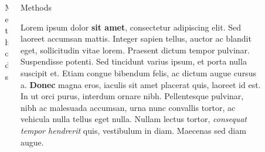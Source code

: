 \documentclass[final]{beamer}
\newlength{\sepwid}
\newlength{\onecolwid}
\newlength{\twocolwid}
\begin{document}
\begin{frame}[t]
\begin{columns}[t]
\begin{column}{\onecolwid}

\begin{figure}
\texttt{[image: poster-003]}
\caption{Figure caption}
\end{figure}


\end{column} %

\begin{column}{\sepwid}\end{column} %

\begin{column}{\twocolwid} %

\begin{columns}[t,totalwidth=\twocolwid] %

\begin{column}{\onecolwid}\vspace{-.6in} %


\begin{block}{Methods}



\end{block}


\end{column} %

\begin{column}{\onecolwid}\vspace{-.6in} %


\begin{block}{Methods}

Lorem ipsum dolor \textbf{sit amet}, consectetur adipiscing elit. Sed laoreet accumsan mattis. Integer sapien tellus, auctor ac blandit eget, sollicitudin vitae lorem. Praesent dictum tempor pulvinar. Suspendisse potenti. Sed tincidunt varius ipsum, et porta nulla suscipit et. Etiam congue bibendum felis, ac dictum augue cursus a. \textbf{Donec} magna eros, iaculis sit amet placerat quis, laoreet id est. In ut orci purus, interdum ornare nibh. Pellentesque pulvinar, nibh ac malesuada accumsan, urna nunc convallis tortor, ac vehicula nulla tellus eget nulla. Nullam lectus tortor, \textit{consequat tempor hendrerit} quis, vestibulum in diam. Maecenas sed diam augue.


\end{block}
\end{column}
\end{columns}
\end{column}
\end{columns}
\end{frame}
\end{document}
